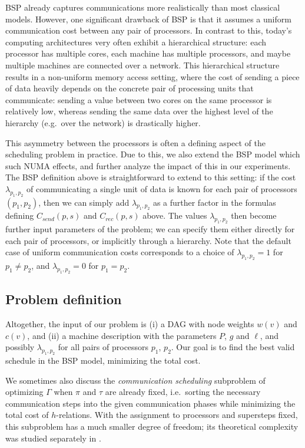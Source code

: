 \documentclass[sigconf,nonacm]{acmart}
\begin{document}
BSP already captures communications more realistically than most classical models. However, one significant drawback of BSP is that it assumes a uniform communication cost between any pair of processors. In contrast to this, today's computing architectures very often exhibit a hierarchical structure: each processor has multiple cores, each machine has multiple processors, and maybe multiple machines are connected over a network. This hierarchical structure results in a non-uniform memory access setting, where the cost of sending a piece of data heavily depends on the concrete pair of processing units that communicate: sending a value between two cores on the same processor is relatively low, whereas sending the same data over the highest level of the hierarchy (e.g.\ over the network) is drastically higher.

This asymmetry between the processors is often a defining aspect of the scheduling problem in practice. Due to this, we also extend the BSP model which such NUMA effects, and further analyze the impact of this in our experiments. The BSP definition above is straightforward to extend to this setting: if the cost $\lambda_{p_1, p_2}$ of communicating a single unit of data is known for each pair of processors $(p_1, p_2)$, then we can simply add $\lambda_{p_1, p_2}$ as a further factor in the formulas defining $C_{send}(p,s)$ and $C_{rec}(p,s)$ above. The values $\lambda_{p_1, p_2}$ then become further input parameters of the problem; we can specify them either directly for each pair of processors, or implicitly through a hierarchy. Note that the default case of uniform communication costs corresponds to a choice of $\lambda_{p_1, p_2\!}=1$ for $p_1 \neq p_2$, and $\lambda_{p_1, p_2\!}=0$ for $p_1 = p_2$.

\subsection{Problem definition}

Altogether, the input of our problem is (i) a DAG with node weights $w(v)$ and $c(v)$, and (ii) a machine description with the parameters $P$, $g$ and $\ell$, and possibly $\lambda_{p_1, p_2}$ for all pairs of processors $p_1$, $p_2$. Our goal is to find the best valid schedule in the BSP model, minimizing the total cost.

We sometimes also discuss the \emph{communication scheduling} subproblem of optimizing $\Gamma$ when $\pi$ and $\tau$ are already fixed, i.e.\ sorting the necessary communication steps into the given communication phases while minimizing the total cost of $h$-relations. With the assignment to processors and supersteps fixed, this subproblem has a much smaller degree of freedom;
its theoretical complexity was studied separately in \cite{DAGBSP}.
\end{document}
